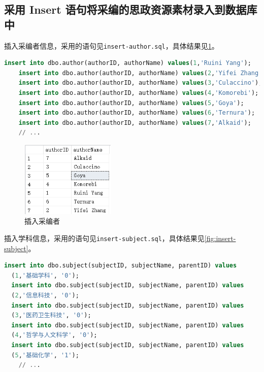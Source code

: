 \documentclass[11pt]{article}
\begin{document}
  \subsection{采用 Insert 语句将采编的思政资源素材录入到数据库中}
  插入采编者信息，采用的语句见\verb|insert-author.sql|，具体结果见\ref{fig:insert}。

  \begin{file}
    \begin{lstlisting}[language=sql]
    insert into dbo.author(authorID, authorName) values(1,'Ruini Yang');
    insert into dbo.author(authorID, authorName) values(2,'Yifei Zhang');
    insert into dbo.author(authorID, authorName) values(3,'Culaccino');
    insert into dbo.author(authorID, authorName) values(4,'Komorebi');
    insert into dbo.author(authorID, authorName) values(5,'Goya');
    insert into dbo.author(authorID, authorName) values(6,'Ternura');
    insert into dbo.author(authorID, authorName) values(7,'Alkaid');
    // ...
    \end{lstlisting}
  \end{file}

  \begin{figure}[h]
    \centering
    \includegraphics[width=0.4\textwidth]{insert.png}
    \caption{插入采编者}
    \label{fig:insert}
  \end{figure}

  插入学科信息，采用的语句见\verb|insert-subject.sql|，具体结果见\ref{fig:insert-subject}。

  \begin{file}
    \begin{lstlisting}[language=sql]
  insert into dbo.subject(subjectID, subjectName, parentID) values
  (1,'基础学科', '0');
  insert into dbo.subject(subjectID, subjectName, parentID) values
  (2,'信息科技', '0');
  insert into dbo.subject(subjectID, subjectName, parentID) values
  (3,'医药卫生科技', '0');
  insert into dbo.subject(subjectID, subjectName, parentID) values
  (4,'哲学与人文科学', '0');
  insert into dbo.subject(subjectID, subjectName, parentID) values
  (5,'基础化学', '1');
    // ...
    \end{lstlisting}
  \end{file}
\end{document}
